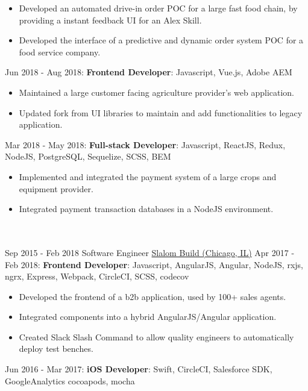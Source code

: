\documentclass[letterpaper]{template} %
\begin{document}
\begin{twenty}
        {\begin{itemize}
            \item Developed an automated drive-in order POC for a large fast food chain, by providing a instant feedback UI for an Alex Skill.
            \item Developed the interface of a predictive and dynamic order system POC for a food service company.
        \end{itemize}}
    \twentyitem
    	{}
		{}
        {}
        {}
        {Jun 2018 - Aug 2018: \textbf{Frontend Developer}: Javascript, Vue.js, Adobe AEM}
        {\begin{itemize}
            \item Maintained a large customer facing agriculture provider's web application.
            \item Updated fork from UI libraries to maintain and add functionalities to legacy application.
        \end{itemize}}
    \twentyitem
    	{}
		{}
        {}
        {}
        {Mar 2018 - May 2018: \textbf{Full-stack Developer}: Javascript, ReactJS, Redux, NodeJS, PostgreSQL, Sequelize, SCSS, BEM}
        {\begin{itemize}
            \item Implemented and integrated the payment system of a large crops and equipment provider. 
            \item Integrated payment transaction databases in a NodeJS environment.
        \end{itemize}}
    \\\divider\\
    \twentyitem
        {Sep 2015 - Feb 2018}
        {}
        {Software Engineer}
        {\href{https://www.slalom.com/}{Slalom Build (Chicago, IL)}}
        {Apr 2017 - Feb 2018: \textbf{Frontend Developer}: Javascript, AngularJS, Angular, NodeJS, rxjs, ngrx, Express, Webpack, CircleCI, SCSS, codecov}
        {\begin{itemize}
            \item Developed the frontend of a b2b application, used by 100+ sales agents.
            \item Integrated components into a hybrid AngularJS/Angular application.
            \item Created Slack Slash Command to allow quality engineers to automatically deploy test benches.
        \end{itemize}}
    \twentyitem
    	{}
		{}
        {}
        {}
        {Jun 2016 - Mar 2017: \textbf{iOS Developer}: Swift, CircleCI, Salesforce SDK, GoogleAnalytics cocoapods, mocha}

\end{twenty}
\end{document}
